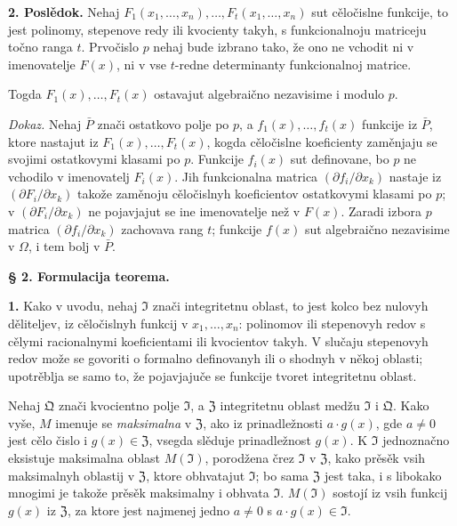 \documentclass[11pt]{article}
\begin{document}
\medskip\noindent\textbf{2. Poslědok.}
Nehaj \(F_1(x_1,\ldots,x_n),\ldots,F_t(x_1,\ldots,x_n)\) sut cěločislne funkcije, to jest polinomy, stepenove redy ili kvocienty takyh, s funkcionalnoju matriceju točno ranga \(t\). Prvočislo \(p\) nehaj bude izbrano tako, že ono ne vchodit ni v imenovatelje \(F(x)\), ni v vse \(t\)-redne determinanty funkcionalnoj matrice.

Togda \(F_1(x),\ldots,F_t(x)\) ostavajut algebraično nezavisime i modulo \(p\).

\noindent\textit{Dokaz.}
Nehaj \(\bar P\) znači ostatkovo polje po \(p\), a \(f_1(x),\ldots,f_t(x)\) funkcije iz \(\bar P\), ktore nastajut iz \(F_1(x),\ldots,F_t(x)\), kogda cěločislne koeficienty zaměnjaju se svojimi ostatkovymi klasami po \(p\). Funkcije \(f_i(x)\) sut definovane, bo \(p\) ne vchodilo v imenovatelj \(F_i(x)\). Jih funkcionalna matrica \((\partial f_i/\partial x_k)\) nastaje iz \((\partial F_i/\partial x_k)\) takože zaměnoju cěločislnyh koeficientov ostatkovymi klasami po \(p\); v \((\partial F_i/\partial x_k)\) ne pojavjajut se ine imenovatelje než v \(F(x)\). Zaradi izbora \(p\) matrica \((\partial f_i/\partial x_k)\) zachovava rang \(t\); funkcije \(f(x)\) sut algebraično nezavisime v \(\Omega\), i tem bolj v \(\bar P\).

\bigskip
\noindent\textbf{§ 2. Formulacija teorema.}

\smallskip
\noindent\textbf{1.}
Kako v uvodu, nehaj \(\mathfrak{I}\) znači integritetnu oblast, to jest kolco bez nulovyh děliteljev, iz cěločislnyh funkcij v \(x_1,\ldots,x_n\): polinomov ili stepenovyh redov s cělymi racionalnymi koeficientami ili kvocientov takyh. V slučaju stepenovyh redov može se govoriti o formalno definovanyh ili o shodnyh v někoj oblasti; upotrěblja se samo to, že pojavjajuče se funkcije tvoret integritetnu oblast.

Nehaj \(\mathfrak{Q}\) znači kvocientno polje \(\mathfrak{I}\), a \(\mathfrak{Z}\) integritetnu oblast medžu \(\mathfrak{I}\) i \(\mathfrak{Q}\). Kako vyše, \(M\) imenuje se \textit{maksimalna} v \(\mathfrak{Z}\), ako iz prinadležnosti \(a\cdot g(x)\), gde \(a\ne0\) jest cělo čislo i \(g(x)\in\mathfrak{Z}\), vsegda slěduje prinadležnost \(g(x)\). K \(\mathfrak{I}\) jednoznačno eksistuje maksimalna oblast \(M(\mathfrak{I})\), porodžena črez \(\mathfrak{I}\) v \(\mathfrak{Z}\), kako prěsěk vsih maksimalnyh oblastij v \(\mathfrak{Z}\), ktore obhvatajut \(\mathfrak{I}\); bo sama \(\mathfrak{Z}\) jest taka, i s libokako mnogimi je takože prěsěk maksimalny i obhvata \(\mathfrak{I}\). \(M(\mathfrak{I})\) sostojí iz vsih funkcij \(g(x)\) iz \(\mathfrak{Z}\), za ktore jest najmenej jedno \(a\ne0\) s \(a\cdot g(x)\in\mathfrak{I}\).
\end{document}
